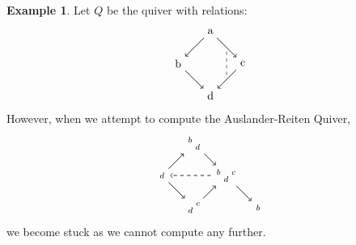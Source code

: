 \documentclass[11.5pt, twoside, a4paper, titlepage]{report}
\theoremstyle{definition}
\newtheorem{eg}[mydef]{Example}
\theoremstyle{plain}
\begin{document}
\begin{eg}
Let $Q$ be the quiver with relations:
\begin{equation*}
\begin{tikzpicture}[->,-latex, auto, m path/.style={->, semithick}, every node/.style={}]
\node				(1) at (0,0)		{a};
\node 				(2) at (-1,-1)		{b};
\node 				(3) at (1,-1)		{c};
\node 				(4) at (0,-2)		{d};
\node				(5) at (0.5,-0.5)	{};
\node 				(6) at (0.5,-1.5)	{};

\draw (1) [m path] edge (2);
\draw (1) [m path] edge (3);
\draw (2) [m path] edge (4);
\draw (3) [m path] edge (4);
\draw (5) [-, dashed] edge (6);
\end{tikzpicture}
\end{equation*}
However, when we attempt to compute the Auslander-Reiten Quiver,
\begin{equation*}
\begin{tikzpicture}[->,-latex, auto, main path/.style={->, semithick}, t path/.style={->, dashed, semithick}, every node/.style={}]
\node			(d) at (0,0)		{$\begin{smallmatrix}d\end{smallmatrix}$};
\node 			(bd) at (1,1)	{$\begin{smallmatrix}b&\\&d\end{smallmatrix}$};
\node 			(cd) at (1,-1)		{$\begin{smallmatrix}&c\\d&  \end{smallmatrix}$};
\node			(bcd) at (2,0)		{$\begin{smallmatrix}b&&c\\&d&\end{smallmatrix}$};
\node 			(b) at (3,-1)	{$\begin{smallmatrix}b\end{smallmatrix}$};



\draw (d) [main path] edge (bd);
\draw (d) [main path] edge (cd);
\draw (bd) [main path] edge (bcd);
\draw (bcd) [main path] edge (b);
\draw (cd) [main path] edge (bcd);

\draw (bcd) [t path] edge (d);
\end{tikzpicture}
\end{equation*}
we become stuck as we cannot compute any further.
\end{eg}
\end{document}
